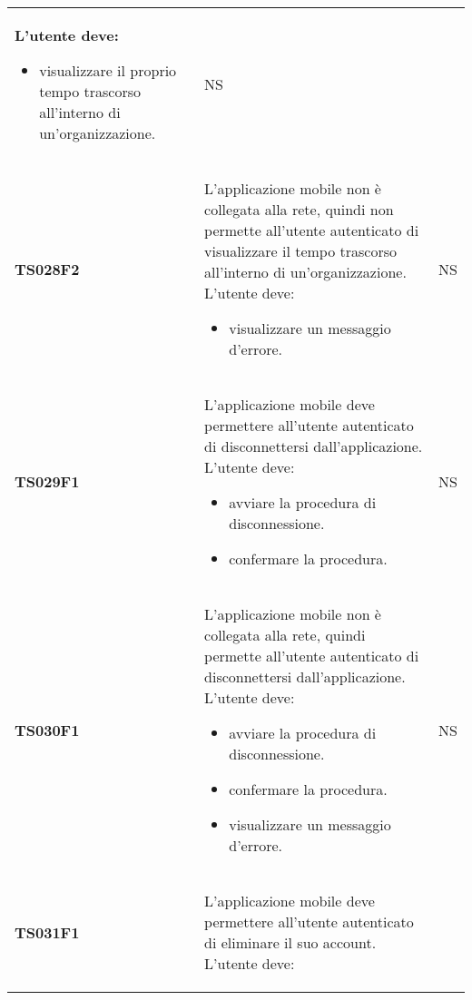 \documentclass[../piano-di-qualifica.tex]{subfiles}
\begin{document}
\begin{centering}
\begin{longtable}[H]{>{\centering\bfseries}m{3cm} >{}p{10cm} >{\centering\arraybackslash}m{3cm}}
                      L'utente deve:
                      \begin{itemize}
                        \item visualizzare il proprio tempo trascorso all'interno di un'organizzazione.
                      \end{itemize}
                    & NS \\
        TS028F2     & L'applicazione mobile non è collegata alla rete, quindi non permette all'utente autenticato di visualizzare il tempo trascorso all'interno di un'organizzazione. \newline
                      L'utente deve:
                      \begin{itemize}
                        \item visualizzare un messaggio d'errore.
                      \end{itemize}
                    & NS \\
        TS029F1     & L'applicazione mobile deve permettere all'utente autenticato di disconnettersi dall'applicazione. \newline
                      L'utente deve:
                      \begin{itemize}
                        \item avviare la procedura di disconnessione.
                        \item confermare la procedura.
                      \end{itemize}
                    & NS \\
        TS030F1     & L'applicazione mobile non è collegata alla rete, quindi permette all'utente autenticato di disconnettersi dall'applicazione. \newline
                      L'utente deve:
                      \begin{itemize}
                        \item avviare la procedura di disconnessione.
                        \item confermare la procedura.
                        \item visualizzare un messaggio d'errore.
                      \end{itemize}
                    & NS \\
        TS031F1     & L'applicazione mobile deve permettere all'utente autenticato di eliminare il suo account. \newline
                      L'utente deve:
                      \begin{itemize}

\end{itemize}
\end{longtable}
\end{centering}
\end{document}

